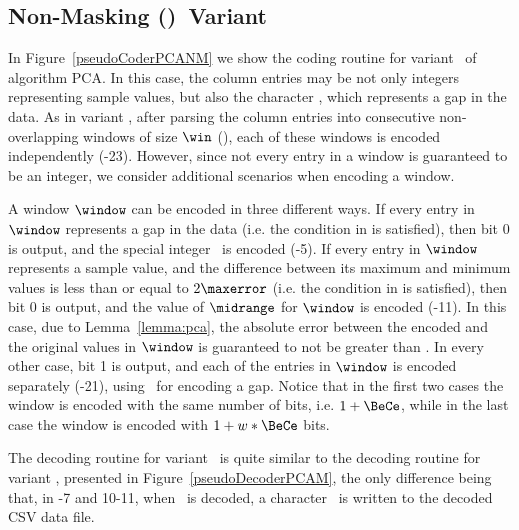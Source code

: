 

\subsection{Non-Masking (\NOmaskalgo)\ Variant}
\label{algo:pca:nmvariant}


In Figure~\ref{pseudoCoderPCANM} we show the coding routine for variant \NOmaskalgo\ of algorithm PCA. In this case, the column entries may be not only integers representing sample values, but also the character \noData, which represents a gap in the data. As in variant \maskalgo, after parsing the column entries into consecutive non-overlapping windows of size $\win$ (), each of these windows is encoded independently (-23). However, since not every entry in a window is guaranteed to be an integer, we consider additional scenarios when encoding a window.





A window $\window$ can be encoded in three different ways. If every entry in $\window$ represents a gap in the data (i.e. the condition in  is satisfied), then bit 0 is output, and the special integer \nodata\ is encoded (-5). If every entry in $\window$ represents a sample value, and the difference between its maximum and minimum values is less than or equal to $2\maxerror$ (i.e. the condition in  is satisfied), then bit 0 is output, and the value of $\midrange$ for $\window$ is encoded (-11). In this case, due to Lemma~\ref{lemma:pca}, the absolute error between the encoded and the original values in $\window$ is guaranteed to not be greater than \maxerror. In every other case, bit 1 is output, and each of the entries in $\window$ is encoded separately (-21), using \nodata\ for encoding a gap. Notice that in the first two cases the window is encoded with the same number of bits, i.e. $1+\BeCe$, while in the last case the window is encoded with $1 + w*\BeCe$ bits.


The decoding routine for variant \NOmaskalgo\ is quite similar to the decoding routine for variant \maskalgo, presented in Figure~\ref{pseudoDecoderPCAM}, the only difference being that, in -7 and 10-11, when \nodata\ is decoded, a character \noData\ is written to the decoded CSV data file.

